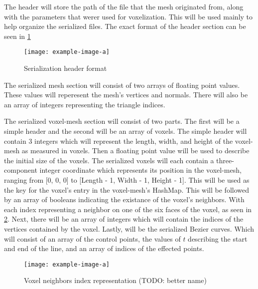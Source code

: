 The header will store the path of the file that the mesh originated from, along with the parameters 
that werer used for voxelization. This will be used mainly to help organize the serialized files.
The exact format of the header section can be seen in \ref{fig:SerializationHeader}

\begin{figure}[h]
  \centering
  \texttt{[image: example-image-a]}
  \caption{Serialization header format}
  \label{fig:SerializationHeader}
\end{figure}

The serialized mesh section will consist of two arrays of floating point values. These values 
will reperesent the mesh's vertices and normals. There will also be an array of integers 
representing the triangle indices.

The serialized voxel-mesh section will consist of two parts. The first will be a simple header and 
the second will be an array of voxels. The simple header will contain 3 integers which will 
represent the length, width, and height of the voxel-mesh as measured in voxels. Then a floating 
point value will be used to describe the initial size of the voxels. The serialized voxels will each
contain a three-component integer coordinate which represents its position in the voxel-mesh, 
ranging from [0, 0, 0] to [Length - 1, Width - 1, Height - 1]. This will be used as the key for 
the voxel's entry in the voxel-mesh's HashMap. This will be followed by an array of booleans 
indicating the existance of the voxel's neighbors. With each index representing a neighbor on one 
of the six faces of the voxel, as seen in \ref{fig:VoxelNeighbors}. Next, there will be an array of
integers which will contain the indices of the vertices contained by the voxel. Lastly, will be the 
serialized Bezier curves. Which will consist of an array of the control points, the values of \(t\)
describing the start and end of the line, and an array of indices of the effected points.

\begin{figure}[h]
  \centering
  \texttt{[image: example-image-a]}
  \caption{Voxel neighbors index representation (TODO: better name)}
  \label{fig:VoxelNeighbors}
\end{figure}


